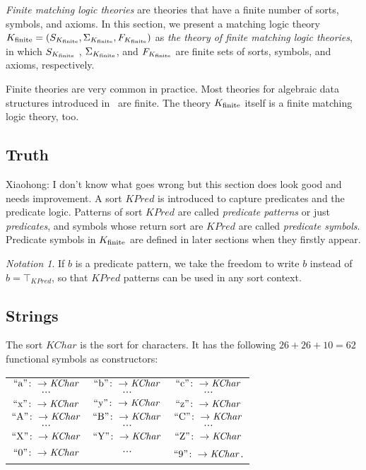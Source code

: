 \documentclass[UTF8,11pt]{article}
\newcounter{thmcounter}
\theoremstyle{plain}
\theoremstyle{definition}
\theoremstyle{remark}
\newtheorem{notation}   [thmcounter]{Notation}
\newcommand{\KPred}{\mathit{KPred}}
\newcommand{\KChar}{\mathit{KChar}}
\newcommand{\quot}[1]{\mathrm{``#1"}}
\begin{document}

\emph{Finite matching logic theories} are theories that have a finite number of sorts, symbols, and axioms.
In this section, we present a matching logic theory ${K_\text{finite}} = ( S_{K_\text{finite}}, \Sigma_{K_\text{finite}}, F_{K_\text{finite}} )$ as \emph{the theory of finite matching logic theories}, in which $S_{K_\text{finite}}$ , $\Sigma_{K_\text{finite}}$, and $F_{K_\text{finite}}$ are finite sets of sorts, symbols, and axioms, respectively.

Finite theories are very common in practice.
Most theories for algebraic data structures introduced in~\cite{rosu-2017-lmcs} are finite. The theory ${K_\text{finite}}$ itself is a finite matching logic theory, too.

\subsection{Truth}
\improvement
{Xiaohong: I don't know what goes wrong but this section does look good and needs improvement.}
A sort $\KPred$ is introduced to capture predicates and the predicate logic.
Patterns of sort $\KPred$ are called \emph{predicate patterns} or just \emph{predicates}, and symbols whose return sort are $\KPred$ are called \emph{predicate symbols}. 
Predicate symbols in ${K_\text{finite}}$ are defined in later sections when they firstly appear.
\begin{notation}
	If $b$ is a predicate pattern, we take the freedom to write $b$ instead of $b = \top_\KPred$, so that $\KPred$ patterns can be used in any sort context.
\end{notation}





\subsection{Strings}
The sort $\KChar$ is the sort for characters. It has the following $26 + 26 + 10 = 62$ functional symbols as constructors:
\begin{center}
	\begin{tabular}{c c c}
		$\quot{a} \colon \to \KChar$ & $\quot{b} \colon \to \KChar$ & $\quot{c} \colon \to \KChar$ \\
		$\cdots$ & $\cdots$ & $\cdots$ \\
		$\quot{x} \colon \to \KChar$ & $\quot{y} \colon \to \KChar$ & $\quot{z} \colon \to \KChar$ \\
		$\quot{A} \colon \to \KChar$ & $\quot{B} \colon \to \KChar$ & $\quot{C} \colon \to \KChar$ \\
		$\cdots$ & $\cdots$ & $\cdots$ \\
		$\quot{X} \colon \to \KChar$ & $\quot{Y} \colon \to \KChar$ & $\quot{Z} \colon \to \KChar$ \\
		$\quot{0} \colon \to \KChar$ & $\cdots$ & $\quot{9} \colon \to \KChar$. 
	\end{tabular}
\end{center}
\end{document}
